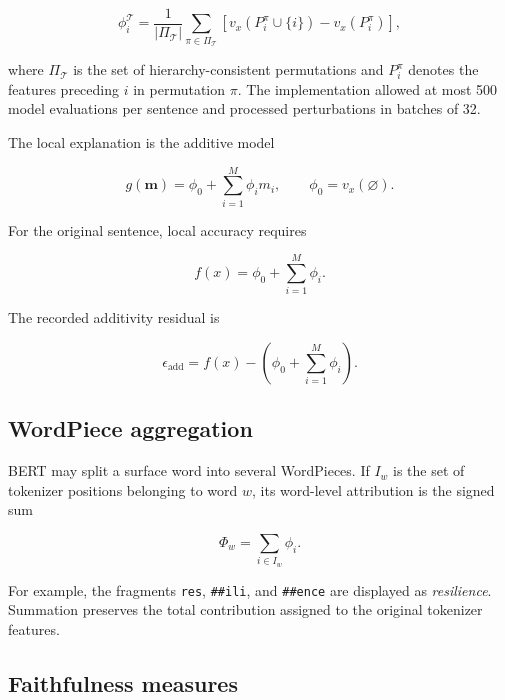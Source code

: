 \documentclass[11pt,a4paper]{article}
\begin{document}
\begin{equation}
  \phi_i^{\mathcal{T}}
  =\frac{1}{|\Pi_{\mathcal{T}}|}
   \sum_{\pi\in\Pi_{\mathcal{T}}}
   \left[
     v_x\!\left(P_i^{\pi}\cup\{i\}\right)
     -v_x\!\left(P_i^{\pi}\right)
   \right],
  \label{eq:owen}
\end{equation}

where \(\Pi_{\mathcal{T}}\) is the set of hierarchy-consistent permutations and
\(P_i^{\pi}\) denotes the features preceding \(i\) in permutation \(\pi\). The
implementation allowed at most 500 model evaluations per sentence and processed
perturbations in batches of 32.

The local explanation is the additive model

\begin{equation}
  g(\mathbf{m})=\phi_0+\sum_{i=1}^{M}\phi_i m_i,
  \qquad \phi_0=v_x(\varnothing).
  \label{eq:additive-model}
\end{equation}

For the original sentence, local accuracy requires

\begin{equation}
  f(x)=\phi_0+\sum_{i=1}^{M}\phi_i.
  \label{eq:local-accuracy}
\end{equation}

The recorded additivity residual is

\begin{equation}
  \epsilon_{\mathrm{add}}
  =f(x)-\left(\phi_0+\sum_{i=1}^{M}\phi_i\right).
  \label{eq:additivity-residual}
\end{equation}

\subsection{WordPiece aggregation}

BERT may split a surface word into several WordPieces. If \(I_w\) is the set of
tokenizer positions belonging to word \(w\), its word-level attribution is the
signed sum

\begin{equation}
  \Phi_w=\sum_{i\in I_w}\phi_i.
  \label{eq:wordpiece}
\end{equation}

For example, the fragments \texttt{res}, \texttt{\#\#ili}, and
\texttt{\#\#ence} are displayed as \emph{resilience}. Summation preserves the
total contribution assigned to the original tokenizer features.

\subsection{Faithfulness measures}
\end{document}
